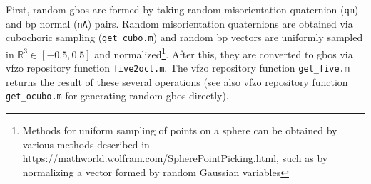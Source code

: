 \documentclass[final,twocolumn,12pt]{elsarticle}
\newcommand{\vfzorepo}{\gls{vfzo} repository}
\begin{document}
First, random \glspl{gbo} are formed by taking random misorientation quaternion (\texttt{qm}) and \gls{bp} normal (\texttt{nA}) pairs. Random misorientation quaternions are obtained via cubochoric sampling \cite{singhOrientationSamplingDictionarybased2016} (\texttt{get\_cubo.m}) and random \gls{bp} vectors are uniformly sampled in $\mathbb{R}^3 \in [-0.5,0.5]$ and normalized\footnote{Methods for uniform sampling of points on a sphere can be obtained by various methods described in \url{https://mathworld.wolfram.com/SpherePointPicking.html}, such as by normalizing a vector formed by random Gaussian variables}. After this, they are converted to \glspl{gbo} via \vfzorepo{} function \texttt{five2oct.m}. The \vfzorepo{} function \texttt{get\_five.m} returns the result of these several operations (see also \vfzorepo{} function \texttt{get\_ocubo.m} for generating random \glspl{gbo} directly).
\end{document}

